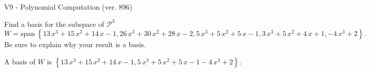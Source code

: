\begin{exercise}
  \begin{exerciseTitle}V9 - Polynomial Computation (ver. 896)\end{exerciseTitle}
  \begin{exerciseStatement}
    Find a basis for the subspace of \(\mathcal{P}^3\) 
\[W=\mathrm{span}\ \left\{13 \, x^{3} + 15 \, x^{2} + 14 \, x - 1 , 26 \, x^{3} + 30 \, x^{2} + 28 \, x - 2 , 5 \, x^{3} + 5 \, x^{2} + 5 \, x - 1 , 3 \, x^{3} + 5 \, x^{2} + 4 \, x + 1 , -4 \, x^{3} + 2\right\}.\]
 Be sure to explain why your result is a basis.


  \end{exerciseStatement}
  \begin{exerciseAnswer}
   A basis of \(W\) is  \(\left\{13 \, x^{3} + 15 \, x^{2} + 14 \, x - 1 , 5 \, x^{3} + 5 \, x^{2} + 5 \, x - 1 -4 \, x^{3} + 2\right\}\).
  


  \end{exerciseAnswer}
\end{exercise}